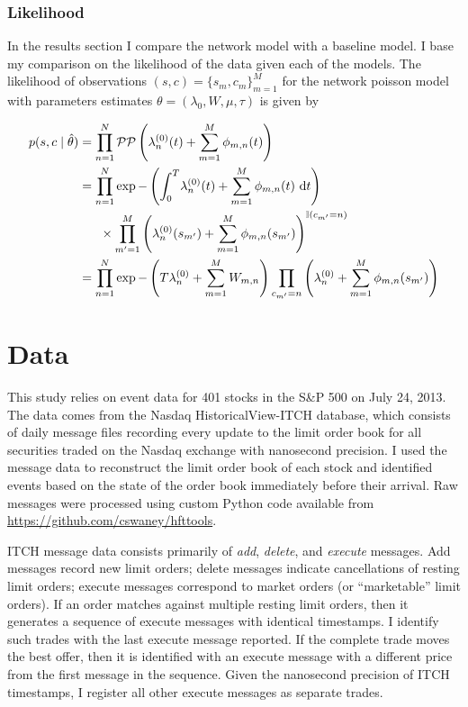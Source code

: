 		\subsubsection*{Likelihood}
			In the results section I compare the network model with a baseline model. I base my comparison on the likelihood of the data given each of the models. The likelihood of observations $(s, c) = \{s_m, c_m\}_{m=1}^M$ for the network poisson model with parameters estimates $\theta = (\lambda_0, W, \mu, \tau)$ is given by

			\begin{align}
			\label{eqn:likelihood}
				p(s, c \mid \hat{\theta}) &= \prod_{n=1}^{N} \mathcal{PP} \left( \lambda_n^{(0)}(t) + \sum_{m=1}^{M} \phi_{m , n}(t) \right) \notag \\
				&= \prod_{n=1}^N \exp -\left( \int_{0}^{T} \! \lambda_n^{(0)}(t) + \sum_{m=1}^{M} \phi_{m , n}(t) \ \mathrm{d}t \right) \notag \\
				& \ \ \ \ \ \times \prod_{m'=1}^M \left( \lambda_n^{(0)}(s_{m'}) + \sum_{m=1}^{M} \phi_{m , n}(s_{m'}) \right)^{\mathbb{I} (c_{m'} = n)} \notag \\
				&= \prod_{n=1}^N \exp -\left(T \lambda_n^{(0)} + \sum_{m=1}^M W_{m,n} \right) \prod_{c_{m'}=n} \left( \lambda_n^{(0)} + \sum_{m=1}^{M} \phi_{m , n}(s_{m'}) \right)
			\end{align}

			\vspace{5mm}


\section{Data}
	This study relies on event data for 401 stocks in the S\&P 500 on July 24, 2013. The data comes from the Nasdaq HistoricalView-ITCH database, which consists of daily message files recording every update to the limit order book for all securities traded on the Nasdaq exchange with nanosecond precision. I used the message data to reconstruct the limit order book of each stock and identified events based on the state of the order book immediately before their arrival. Raw messages were processed using custom Python code available from \url{https://github.com/cswaney/hfttools}.

	ITCH message data consists primarily of \textit{add}, \textit{delete}, and \textit{execute} messages. Add messages record new limit orders; delete messages indicate cancellations of resting limit orders; execute messages correspond to market orders (or ``marketable'' limit orders). If an order matches against multiple resting limit orders, then it generates a sequence of execute messages with identical timestamps. I identify such trades with the last execute message reported. If the complete trade moves the best offer, then it is identified with an execute message with a different price from the first message in the sequence. Given the nanosecond precision of ITCH timestamps, I register all other execute messages as separate trades.

